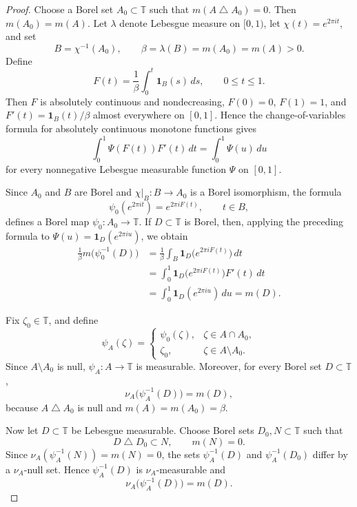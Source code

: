 \documentclass[11pt, reqno]{amsart}
\theoremstyle{definition}
\theoremstyle{remark}
\newcommand{\T}{\mathbb{T}}
\begin{document}
\begin{proof}
Choose a Borel set \(A_0\subset\T\) such that
\( m(A\mathbin{\triangle}A_0)=0.
\)
Then \(m(A_0)=m(A)\). Let \(\lambda\) denote Lebesgue measure on
\([0,1)\), let \(\chi(t)=e^{2\pi it}\), and set
\[
        B=\chi^{-1}(A_0),
        \qquad
        \beta=\lambda(B)=m(A_0)=m(A)>0.
\]
Define
\[
        F(t)
        =
        \frac1\beta\int_0^t\mathbf1_B(s)\,ds,
        \qquad
        0\le t\le1.
\]
Then \(F\) is absolutely continuous and nondecreasing,
\(F(0)=0\), \(F(1)=1\), and
\(F'(t)=\mathbf1_B(t)/\beta\) almost everywhere on \([0,1]\).
Hence the change-of-variables formula for absolutely continuous
monotone functions \cite[p.~156]{Rudin1987} gives
\[
        \int_0^1 \Psi(F(t))F'(t)\,dt
        =
        \int_0^1 \Psi(u)\,du
\]
for every nonnegative Lebesgue measurable function
\(\Psi\) on \([0,1]\).

Since \(A_0\) and \(B\) are Borel and
\(\chi|_B:B\to A_0\) is a Borel isomorphism, the formula
\[
        \psi_0(e^{2\pi it})
        =
        e^{2\pi iF(t)},
        \qquad
        t\in B,
\]
defines a Borel map \(\psi_0:A_0\to\T\). If
\(D\subset\T\) is Borel, then, applying the preceding formula to
\(\Psi(u)=\mathbf1_D(e^{2\pi iu})\), we obtain
\[
\begin{aligned}
        \frac1{\beta}
        m\bigl(\psi_0^{-1}(D)\bigr)
        &=
        \frac1\beta
        \int_B
        \mathbf1_D\bigl(e^{2\pi iF(t)}\bigr)\,dt\\
        &=
        \int_0^1
        \mathbf1_D\bigl(e^{2\pi iF(t)}\bigr)F'(t)\,dt\\
        &=
        \int_0^1\mathbf1_D(e^{2\pi iu})\,du
        =
        m(D).
\end{aligned}
\]

Fix \(\zeta_0\in\T\), and define
\[
        \psi_A(\zeta)
        =
        \begin{cases}
        \psi_0(\zeta),
                & \zeta\in A\cap A_0,\\
        \zeta_0,
                & \zeta\in A\setminus A_0.
        \end{cases}
\]
Since \(A\setminus A_0\) is null, \(\psi_A:A\to\T\) is measurable.
Moreover, for every Borel set \(D\subset\T\),
\[
        \nu_A\bigl(\psi_A^{-1}(D)\bigr)
        =
        m(D),
\]
because \(A\mathbin{\triangle}A_0\) is null and
\(m(A)=m(A_0)=\beta\).

Now let \(D\subset\T\) be Lebesgue measurable. Choose Borel sets
\(D_0,N\subset\T\) such that
\[
        D\mathbin{\triangle}D_0\subset N,
        \qquad
        m(N)=0.
\]
Since
\(\nu_A(\psi_A^{-1}(N))=m(N)=0\), the sets
\(\psi_A^{-1}(D)\) and \(\psi_A^{-1}(D_0)\) differ by a
\(\nu_A\)-null set. Hence \(\psi_A^{-1}(D)\) is
\(\nu_A\)-measurable and
\[
        \nu_A\bigl(\psi_A^{-1}(D)\bigr)
        =
        m(D).
\]


\end{proof}
\end{document}
